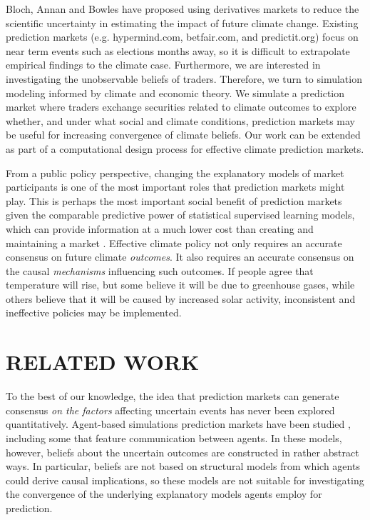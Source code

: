 \documentclass{wscpaperproc}\usepackage[]{graphicx}\usepackage[]{color}
\begin{document}
Bloch, Annan and Bowles  have proposed using derivatives markets to reduce the scientific uncertainty in estimating the impact of future climate change. Existing prediction markets (e.g. hypermind.com, betfair.com, and predictit.org) focus on near term events such as elections months away, so it is difficult to extrapolate empirical findings to the climate case. Furthermore, we are interested in investigating the unobservable beliefs of traders. Therefore, we turn to simulation modeling informed by climate and economic theory. We simulate a prediction market where traders exchange securities related to climate outcomes to explore whether, and under what social and climate conditions, prediction markets may be useful for increasing convergence of climate beliefs. Our work can be extended as part of a computational design process for effective climate prediction markets.

From a public policy perspective, changing the explanatory models of market participants is one of the most important roles that prediction markets might play. This is perhaps the most important social benefit of prediction markets given the comparable predictive power of statistical supervised learning models, which can provide information at a much lower cost than creating and maintaining a market . Effective climate policy not only requires an accurate consensus on future climate \emph{outcomes\/}. It also requires an accurate consensus on the causal \emph{mechanisms\/} influencing such outcomes. If people agree that temperature will rise, but some believe it will be due to greenhouse gases, while others believe that it will be caused by increased solar activity, inconsistent and ineffective policies may be implemented.

\section{RELATED WORK}

To the best of our knowledge, the idea that prediction markets can generate consensus \emph{on the factors\/} affecting uncertain events has never been explored quantitatively. Agent-based simulations prediction markets have been studied , including some that feature communication between agents. In these models, however, beliefs about the uncertain outcomes are constructed in rather abstract ways. In particular, beliefs are not based on structural models from which agents could derive causal implications, so these models are not suitable for investigating the convergence of the underlying explanatory models agents employ for prediction.
\end{document}
